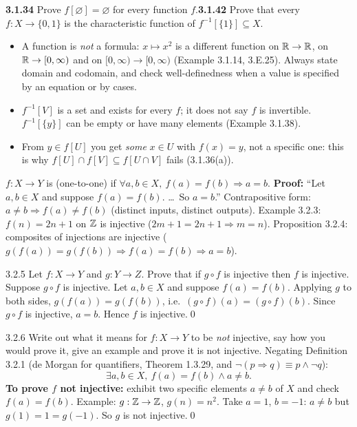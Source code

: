 \begin{trybox}[{3.1.34, 3.1.42 \fO}]
\textbf{3.1.34} Prove $f[\varnothing]=\varnothing$ for every function $f$.\quad \textbf{3.1.42} Prove that every $f:X\to\{0,1\}$ is the characteristic function of $f^{-1}[\{1\}]\subseteq X$.
\end{trybox}

\begin{warn}
\begin{itemize}
\item A function is \emph{not} a formula: $x\mapsto x^2$ is a different function on $\mathbb{R}\to\mathbb{R}$, on $\mathbb{R}\to[0,\infty)$ and on $[0,\infty)\to[0,\infty)$ (Example 3.1.14, 3.E.25). Always state domain and codomain, and check well-definedness when a value is specified by an equation or by cases.
\item $f^{-1}[V]$ is a set and exists for every $f$; it does not say $f$ is invertible. $f^{-1}[\{y\}]$ can be empty or have many elements (Example 3.1.38).
\item From $y\in f[U]$ you get \emph{some} $x\in U$ with $f(x)=y$, not a specific one: this is why $f[U]\cap f[V]\subseteq f[U\cap V]$ fails (3.1.36(a)).
\end{itemize}
\end{warn}


\begin{key}
$f:X\to Y$ is  (one-to-one) if $\forall a,b\in X,\ f(a)=f(b)\Rightarrow a=b$. \textbf{Proof:} ``Let $a,b\in X$ and suppose $f(a)=f(b)$. \dots\ So $a=b$.'' Contrapositive form: $a\ne b\Rightarrow f(a)\ne f(b)$ (distinct inputs, distinct outputs). Example 3.2.3: $f(n)=2n+1$ on $\mathbb{Z}$ is injective ($2m+1=2n+1\Rightarrow m=n$). Proposition 3.2.4: composites of injections are injective ($g(f(a))=g(f(b))\Rightarrow f(a)=f(b)\Rightarrow a=b$).
\end{key}

\begin{bookex}[essential]{3.2.5}
Let $f:X\to Y$ and $g:Y\to Z$. Prove that if $g\circ f$ is injective then $f$ is injective.
\solution
Suppose $g\circ f$ is injective. Let $a,b\in X$ and suppose $f(a)=f(b)$. Applying $g$ to both sides, $g(f(a))=g(f(b))$, i.e.\ $(g\circ f)(a)=(g\circ f)(b)$. Since $g\circ f$ is injective, $a=b$. Hence $f$ is injective.\qed
\end{bookex}

\begin{bookex}[recommended]{3.2.6}
Write out what it means for $f:X\to Y$ to be \emph{not} injective, say how you would prove it, give an example and prove it is not injective.
\solution
Negating Definition 3.2.1 (de Morgan for quantifiers, Theorem 1.3.29, and $\neg(p\Rightarrow q)\equiv p\wedge\neg q$):
\[
\exists a,b\in X,\ f(a)=f(b)\wedge a\ne b .
\]
\textbf{To prove $f$ not injective:} exhibit two specific elements $a\ne b$ of $X$ and check $f(a)=f(b)$. Example: $g:\mathbb{Z}\to\mathbb{Z}$, $g(n)=n^2$. Take $a=1$, $b=-1$: $a\ne b$ but $g(1)=1=g(-1)$. So $g$ is not injective.\qed
\end{bookex}

